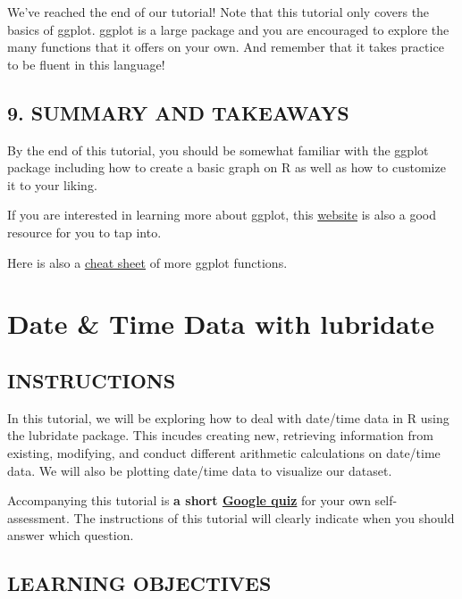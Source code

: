 \documentclass[
]{book}
\begin{document}
We've reached the end of our tutorial! Note that this tutorial only covers the basics of ggplot. ggplot is a large package and you are encouraged to explore the many functions that it offers on your own. And remember that it takes practice to be fluent in this language!

\hypertarget{summary-and-takeaways}{%
\section{9. SUMMARY AND TAKEAWAYS}\label{summary-and-takeaways}}

By the end of this tutorial, you should be somewhat familiar with the ggplot package including how to create a basic graph on R as well as how to customize it to your liking.

If you are interested in learning more about ggplot, this \href{https://ggplot2.tidyverse.org/}{website} is also a good resource for you to tap into.

Here is also a \href{https://github.com/rstudio/cheatsheets/blob/master/data-visualization-2.1.pdf}{cheat sheet} of more ggplot functions.

\hypertarget{date-time-data-with-lubridate}{%
\chapter{Date \& Time Data with lubridate}\label{date-time-data-with-lubridate}}

\hypertarget{instructions-6}{%
\section{INSTRUCTIONS}\label{instructions-6}}

In this tutorial, we will be exploring how to deal with date/time data in R using the lubridate package. This incudes creating new, retrieving information from existing, modifying, and conduct different arithmetic calculations on date/time data. We will also be plotting date/time data to visualize our dataset.

Accompanying this tutorial is \textbf{a short \href{https://forms.gle/zt9vGevq3zuqGBTG8}{Google quiz}} for your own self-assessment. The instructions of this tutorial will clearly indicate when you should answer which question.

\hypertarget{learning-objectives-6}{%
\section{LEARNING OBJECTIVES}\label{learning-objectives-6}}
\end{document}
